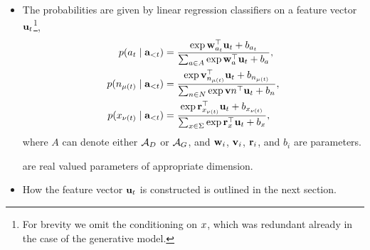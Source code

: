 \begin{itemize}
  \item The probabilities are given by linear regression classifiers on a feature vector $\mathbf{u}_t$\footnote{For brevity we omit the conditioning on $x$, which was redundant already in the case of the generative model.},
  \begin{align}
    \label{eq:action-regression}
    p(a_t \mid \mathbf{a}_{<t})
      &= \frac{ \exp \mathbf{w}_{a_t}^{\top} \mathbf{u}_t + b_{a_t} }{ \sum_{a \in A} \exp \mathbf{w}_{a}^{\top} \mathbf{u}_t + b_{a} },  \\
    p(n_{\mu(t)} \mid \mathbf{a}_{<t})
      &= \frac{ \exp \mathbf{v}_{n_{\mu(t)}}^{\top} \mathbf{u}_t + b_{n_{\mu(t)}} }{ \sum_{n \in N} \exp \mathbf{v} {n}^{\top} \mathbf{u}_t + b_{n} }, \\
    p(x_{\nu(t)} \mid \mathbf{a}_{<t})
      &= \frac{ \exp \mathbf{r}_{x_{\nu(t)}}^{\top} \mathbf{u}_t + b_{x_{\nu(t)}} }{ \sum_{x \in \Sigma} \exp \mathbf{r}_{x}^{\top} \mathbf{u}_t + b_{x} },  \\
  \end{align}
  where $A$ can denote either $\mathcal{A}_D$ or $\mathcal{A}_G$, and $\mathbf{w}_i$, $\mathbf{v}_i$, $\mathbf{r}_i$, and $b_i$ are parameters.


  are real valued parameters of appropriate dimension.

  \item How the feature vector $\mathbf{u}_t$ is constructed is outlined in the next section.


\end{itemize}
